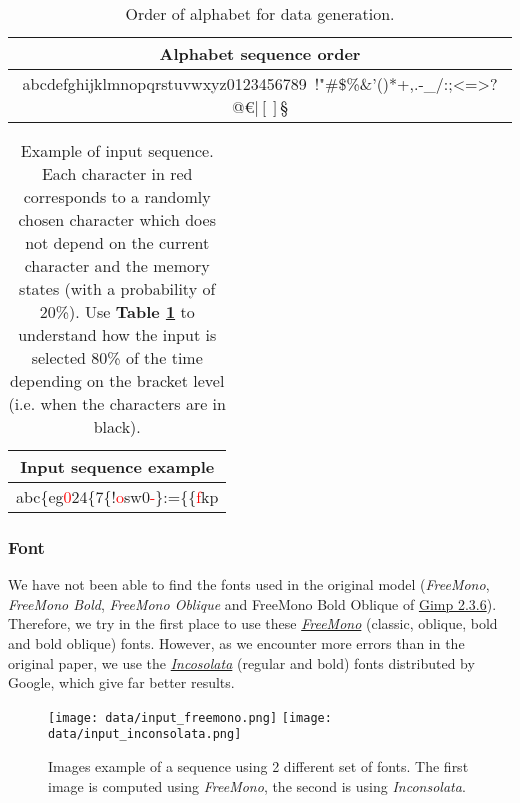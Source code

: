\begin{table}[!ht]
    \centering
    \begin{tabular}{|c|}
        \hline
        \textbf{Alphabet sequence order} \\ \hline \hline
        abcdefghijklmnopqrstuvwxyz0123456789\ !"\#\$\%\&'()*+,.-\_/:;<=>?@€|$[]$§\\ \hline %
    \end{tabular}
    \caption{Order of alphabet for data generation.}
    \label{tab:alphabet}
\end{table}

\begin{table}[!ht]
    \centering
    \begin{tabular}{|c|}
        \hline
        \textbf{Input sequence example} \\ \hline \hline
        abc\{eg\textcolor{red}{0}24\{7\{!\textcolor{red}{o}sw0\textcolor{red}{-}\}:=\{\{\textcolor{red}{f}kp\\ \hline
    \end{tabular}
    \caption{Example of input sequence. Each character in red corresponds to a randomly chosen character which does not depend on the current character and the memory states (with a probability of 20\%). Use \textbf{Table \ref{tab:alphabet}} to understand how the input is selected 80\% of the time depending on the bracket level (i.e. when the characters are in black).}
    \label{tab:sequence_example}
\end{table}

\subsubsection{Font}

We have not been able to find the fonts used in the original model (\textit{FreeMono}, \textit{FreeMono Bold}, \textit{FreeMono Oblique} and FreeMono Bold Oblique of \href{https://gimp.software/2018/11/13/download-gimp-2-3-6/}{Gimp 2.3.6}).
Therefore, we try in the first place to use these \href{https://www.fontspace.com/gnu-freefont/freemono}{\textit{FreeMono}} (classic, oblique, bold and bold oblique) fonts.
However, as we encounter more errors than in the original paper, we use the \href{https://fonts.google.com/specimen/Inconsolata}{\textit{Incosolata}} (regular and bold) fonts distributed by Google, which give far better results.

\begin{figure}[h]
    \centering
    \texttt{[image: data/input\_freemono.png]}
    \texttt{[image: data/input\_inconsolata.png]}
    \caption{Images example of a sequence using 2 different set of fonts. The first image is computed using \textit{FreeMono}, the second is using \textit{Inconsolata}.}
    \label{fig:input_imgs}
\end{figure}

